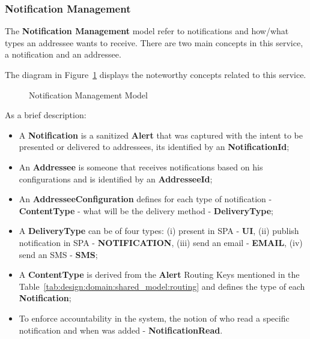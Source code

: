 \subsubsection{Notification Management}
\label{subsubsec:design:domain:bounded_contexts:notification}

The \textbf{Notification Management} model refer to notifications and how/what types an addressee wants to receive. There are two main concepts in this service, a notification and an addressee.

The diagram in Figure~\ref{fig:design:domain:bounded_contexts:notification:diagram} displays the noteworthy concepts related to this service.

\begin{figure}[H]
   \centering
  \resizebox{\columnwidth}{!}
  {
     
  }
  \caption[Notification Management Model]{Notification Management Model}
  \label{fig:design:domain:bounded_contexts:notification:diagram}
\end{figure}

As a brief description:

\begin{itemize}
   \item A \textbf{Notification} is a sanitized \textbf{Alert} that was captured with the intent to be presented or delivered to addressees, its identified by an \textbf{NotificationId};
   \item An \textbf{Addressee} is someone that receives notifications based on his configurations and is identified by an \textbf{AddresseeId};
   \item An \textbf{AddresseeConfiguration} defines for each type of notification - \textbf{ContentType} - what will be the delivery method - \textbf{DeliveryType};
   \item A \textbf{DeliveryType} can be of four types: (i) present in SPA - \textbf{UI}, (ii) publish notification in SPA - \textbf{NOTIFICATION}, (iii) send an email - \textbf{EMAIL}, (iv) send an SMS - \textbf{SMS};
   \item A \textbf{ContentType} is derived from the \textbf{Alert} Routing Keys mentioned in the Table~\ref{tab:design:domain:shared_model:routing} and defines the type of each \textbf{Notification};
   \item To enforce accountability in the system, the notion of who read a specific notification and when was added - \textbf{NotificationRead}.
\end{itemize}

